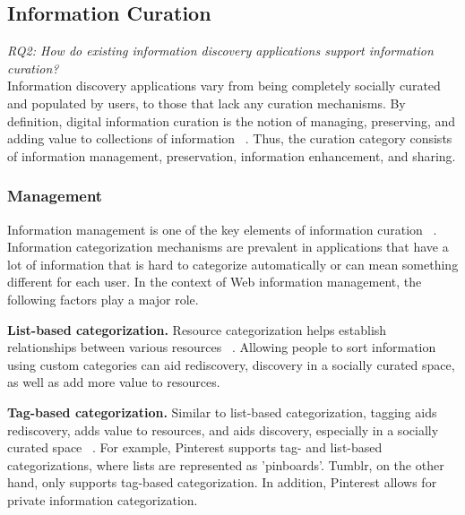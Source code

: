 {\subsection{Information Curation}
\emph{RQ2: How do existing information discovery applications support information curation?}\\

Information discovery applications vary from being completely socially curated and populated by users, to those that lack any curation mechanisms. 
By definition, digital information curation is the notion of managing, preserving, and adding value to collections of information ~\cite{beagrie, wittaker}. Thus, the curation category consists of information management, preservation, information enhancement, and sharing.  
} %

{\subsubsection{Management}
Information management is one of the key elements of information curation ~\cite{beagrie, wittaker}. Information categorization mechanisms are prevalent in applications that have a lot of information that is hard to categorize automatically or can mean something different for each user. In the context of Web information management, the following factors play a major role.

\textbf{List-based categorization.} Resource categorization helps establish relationships between various resources ~\cite{beagrie, wittaker}. Allowing people to sort information using custom categories can aid rediscovery, discovery in a socially curated space, as well as add more value to resources.

\textbf{Tag-based categorization.} Similar to list-based categorization, tagging aids rediscovery, adds value to resources, and aids discovery, especially in a socially curated space ~\cite{gruber}.  For example, Pinterest supports tag- and list-based categorizations, where lists are represented as 'pinboards'. Tumblr, on the other hand, only supports tag-based categorization. In addition, Pinterest allows for private information categorization.

} %

